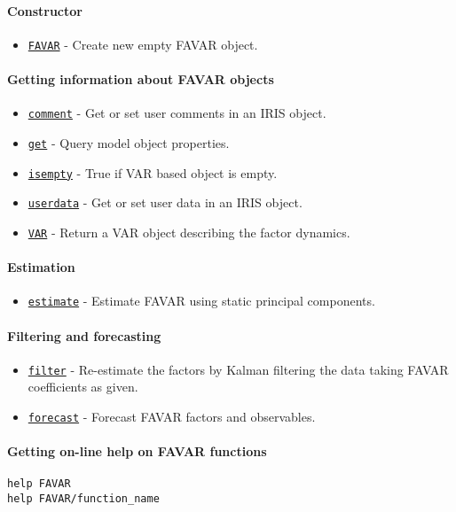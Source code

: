 

	\paragraph{Constructor}

\begin{itemize}
\itemsep1pt\parskip0pt
\item
  \href{FAVAR/FAVAR}{\texttt{FAVAR}} - Create new empty FAVAR object.
\end{itemize}

\paragraph{Getting information about FAVAR
objects}

\begin{itemize}
\itemsep1pt\parskip0pt
\item
  \href{FAVAR/comment}{\texttt{comment}} - Get or set user comments in
  an IRIS object.
\item
  \href{FAVAR/get}{\texttt{get}} - Query model object properties.
\item
  \href{FAVAR/isempty}{\texttt{isempty}} - True if VAR based object is
  empty.
\item
  \href{FAVAR/userdata}{\texttt{userdata}} - Get or set user data in an
  IRIS object.
\item
  \href{FAVAR/VAR}{\texttt{VAR}} - Return a VAR object describing the
  factor dynamics.
\end{itemize}

\paragraph{Estimation}

\begin{itemize}
\itemsep1pt\parskip0pt
\item
  \href{FAVAR/estimate}{\texttt{estimate}} - Estimate FAVAR using static
  principal components.
\end{itemize}

\paragraph{Filtering and forecasting}

\begin{itemize}
\itemsep1pt\parskip0pt
\item
  \href{FAVAR/filter}{\texttt{filter}} - Re-estimate the factors by
  Kalman filtering the data taking FAVAR coefficients as given.
\item
  \href{FAVAR/forecast}{\texttt{forecast}} - Forecast FAVAR factors and
  observables.
\end{itemize}

\paragraph{Getting on-line help on FAVAR
functions}

\begin{verbatim}
help FAVAR
help FAVAR/function_name
\end{verbatim}



